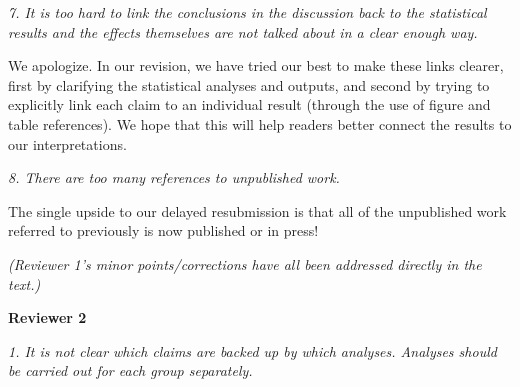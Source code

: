 \documentclass[11pt,a4paper]{letter} %
\begin{document}
\begin{letter}{}

\smallskip

\noindent \textit{7. It is too hard to link the conclusions in the discussion back to the statistical results and the effects themselves are not talked about in a clear enough way.}

\noindent We apologize. In our revision, we have tried our best to make these links clearer, first by clarifying the statistical analyses and outputs, and second by trying to explicitly link each claim to an individual result (through the use of figure and table references). We hope that this will help readers better connect the results to our interpretations.

\smallskip

\noindent \textit{8. There are too many references to unpublished work.}

\noindent The single upside to our delayed resubmission is that all of the unpublished work referred to previously is now published or in press!

\smallskip

\noindent \textit{(Reviewer 1's minor points/corrections have all been addressed directly in the text.)}

\bigskip

\noindent \textbf{Reviewer 2}

\noindent \textit{1. It is not clear which claims are backed up by which analyses. Analyses should be carried out for each group separately.}


\end{letter}
\end{document}
